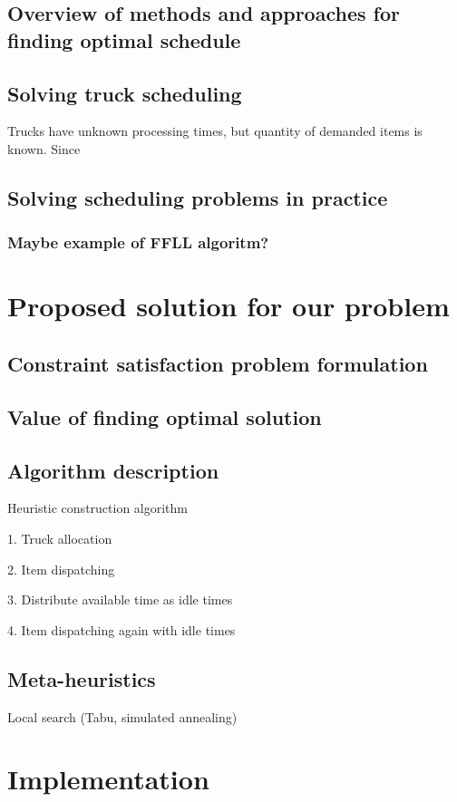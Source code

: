 \documentclass{ctuthesis}
\begin{document}
\section{Overview of methods and approaches for finding optimal schedule}
\section{Solving truck scheduling}

Trucks have unknown processing times, but quantity of demanded items is known. Since 
\section{Solving scheduling problems in practice}
\subsection{Maybe example of FFLL algoritm?}
\chapter{Proposed solution for our problem}
\section{Constraint satisfaction problem formulation}
\section{Value of finding optimal solution}
\section{Algorithm description}
Heuristic construction algorithm

1. Truck allocation

2. Item dispatching

3. Distribute available time as idle times

4. Item dispatching again with idle times

\section{Meta-heuristics}
Local search (Tabu, simulated annealing)

\chapter{Implementation}
\end{document}
